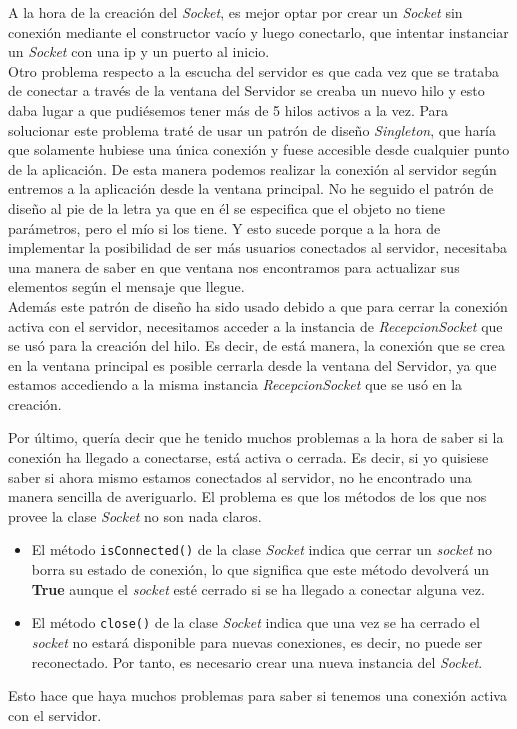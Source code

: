 A la hora de la creación del \textit{Socket}, es mejor optar por crear un \textit{Socket} sin conexión mediante el constructor vacío y luego conectarlo, que intentar instanciar un \textit{Socket} con una ip y un puerto al inicio.\\
Otro problema respecto a la escucha del servidor es que cada vez que se trataba de conectar a través de la ventana del Servidor se creaba un nuevo hilo y esto daba lugar a que pudiésemos tener más de 5 hilos activos a la vez. Para solucionar este problema traté de usar un patrón de diseño \textit{Singleton}, que haría que solamente hubiese una única conexión y fuese accesible desde cualquier punto de la aplicación. De esta manera podemos realizar la conexión al servidor según entremos a la aplicación desde la ventana principal.
No he seguido el patrón de diseño al pie de la letra ya que en él se especifica que el objeto no tiene parámetros, pero el mío si los tiene. Y esto sucede porque a la hora de implementar la posibilidad de ser más usuarios conectados al servidor, necesitaba una manera de saber en que ventana nos encontramos para actualizar sus elementos según el mensaje que llegue.\\
Además este patrón de diseño ha sido usado debido a que para cerrar la conexión activa con el servidor, necesitamos acceder a la instancia de \textit{RecepcionSocket} que se usó para la creación del hilo. Es decir, de está manera, la conexión que se crea en la ventana principal es posible cerrarla desde la ventana del Servidor, ya que estamos accediendo a la misma instancia \textit{RecepcionSocket} que se usó en la creación.

Por último, quería decir que he tenido muchos problemas a la hora de saber si la conexión ha llegado a conectarse, está activa o cerrada. Es decir, si yo quisiese saber si ahora mismo estamos conectados al servidor, no he encontrado una manera sencilla de averiguarlo. El problema es que los métodos de los que nos provee la clase \textit{Socket} no son nada claros.

\begin{itemize}
	\item El método \verb|isConnected()| \cite{android:isConnected} de la clase \textit{Socket} indica que cerrar un \textit{socket} no borra su estado de conexión, lo que significa que este método devolverá un \textbf{True} aunque el \textit{socket} esté cerrado si se ha llegado a conectar alguna vez.
	\item El método \verb|close()| \cite{android:close} de la clase \textit{Socket} indica que una vez se ha cerrado el \textit{socket} no estará disponible para nuevas conexiones, es decir, no puede ser reconectado. Por tanto, es necesario crear una nueva instancia del \textit{Socket}.
\end{itemize}

Esto hace que haya muchos problemas para saber si tenemos una conexión activa con el servidor.
